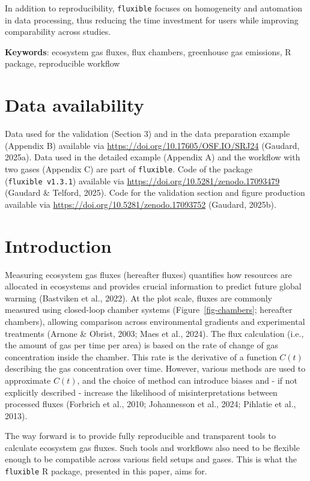 \documentclass[
  letterpaper,
  DIV=11,
  numbers=noendperiod]{scrartcl}
\begin{document}
In addition to reproducibility, \texttt{fluxible} focuses on homogeneity
and automation in data processing, thus reducing the time investment for
users while improving comparability across studies.

\textbf{Keywords}: ecosystem gas fluxes, flux chambers, greenhouse gas
emissions, R package, reproducible workflow

\section*{Data availability}\label{data-availability}

Data used for the validation (Section 3) and in the data preparation
example (Appendix B) available via
\url{https://doi.org/10.17605/OSF.IO/SRJ24} (Gaudard, 2025a). Data used
in the detailed example (Appendix A) and the workflow with two gases
(Appendix C) are part of \texttt{fluxible}. Code of the package
(\texttt{fluxible\ v1.3.1}) available via
\url{https://doi.org/10.5281/zenodo.17093479} (Gaudard \& Telford,
2025). Code for the validation section and figure production available
via \url{https://doi.org/10.5281/zenodo.17093752} (Gaudard, 2025b).

\section{Introduction}\label{introduction}

Measuring ecosystem gas fluxes (hereafter fluxes) quantifies how
resources are allocated in ecosystems and provides crucial information
to predict future global warming (Bastviken et al., 2022). At the plot
scale, fluxes are commonly measured using closed-loop chamber systems
(Figure~\ref{fig-chambers}; hereafter chambers), allowing comparison
across environmental gradients and experimental treatments (Arnone \&
Obrist, 2003; Maes et al., 2024). The flux calculation (i.e., the amount
of gas per time per area) is based on the rate of change of gas
concentration inside the chamber. This rate is the derivative of a
function \(C(t)\) describing the gas concentration over time. However,
various methods are used to approximate \(C(t)\), and the choice of
method can introduce biases and - if not explicitly described - increase
the likelihood of misinterpretations between processed fluxes (Forbrich
et al., 2010; Johannesson et al., 2024; Pihlatie et al., 2013).

The way forward is to provide fully reproducible and transparent tools
to calculate ecosystem gas fluxes. Such tools and workflows also need to
be flexible enough to be compatible across various field setups and
gases. This is what the \texttt{fluxible} R package, presented in this
paper, aims for.
\end{document}
